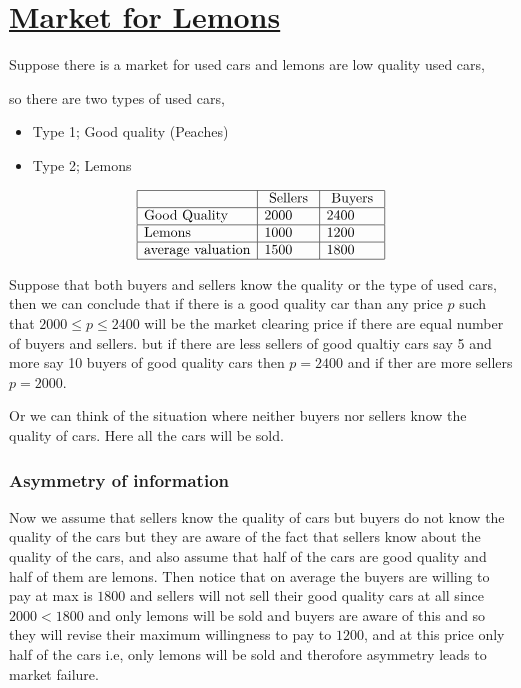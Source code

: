 \documentclass[12pt,a4paper]{article}
\begin{document}
 \section{\underline{Market for Lemons}} 
Suppose there is a market for used cars and lemons are low quality used cars,

so there are two types of used cars, 

\begin{itemize}
    \item Type 1; Good quality (Peaches)

    \item Type 2; Lemons
\end{itemize}

 \begin{align*}
    \begin{array}{|l|l|l|}
    \hline & \text{ Sellers } & \text { Buyers } \\
    \hline \text{Good Quality} & 2000 & 2400 \\
    \hline \text{Lemons} & 1000 & 1200\\
    \hline \text{average valuation} & 1500 & 1800\\
    \hline
    \end{array}
    \end{align*}

Suppose that both buyers and sellers know the quality or the type of used cars, then we can conclude that if there is a good quality car than any price \(p\) such that \(2000 \leq p \leq 2400\)  will be the market clearing price if there are equal number of buyers and sellers. but if there are less sellers of good qualtiy cars say 5 and more say 10 buyers of good quality cars then \(p=2400\) and if ther are more sellers \(p=2000\).  

Or we can think of the situation where neither buyers nor sellers know the quality of cars. Here all the cars will be sold.


 \subsubsection*{ Asymmetry of information } 
Now we assume that sellers know the quality of cars but buyers do not know the quality of the cars but they are aware of the fact that sellers know about the quality of the cars, and also assume that half of the cars are good quality and half of them are lemons. Then notice that on average the buyers are willing to pay at max is \(1800\) and sellers will not sell their good quality cars at all since \(2000<1800\)  and only lemons will be sold and buyers are aware of this and so they will revise their maximum willingness to pay to \(1200\),  and at this price only half of the cars i.e, only lemons will be sold and therofore asymmetry leads to market failure.
\end{document}
